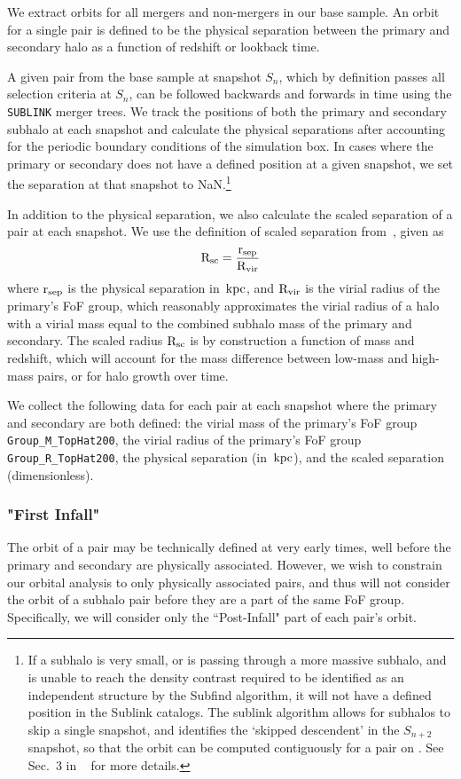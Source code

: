 \documentclass[twocolumn,linenumbers]{aastex631}
\newcommand{\Rvir}{\ensuremath{\rm R_{vir}}}
\newcommand{\Rsc}{\ensuremath{\rm R_{sc}}}
\newcommand{\rsep}{\ensuremath{\rm r_{sep}}}
\begin{document}
We extract orbits for all mergers and non-mergers in our base sample. 
An orbit for a single pair is defined to be the physical separation between the primary and secondary halo as a function of redshift or lookback time. 

A given pair from the base sample at snapshot $S_n$, which by definition passes all selection criteria at $S_n$, can be followed backwards and forwards in time using the \texttt{SUBLINK} merger trees.  
We track the positions of both the primary and secondary subhalo at each snapshot and calculate the physical separations after accounting for the periodic boundary conditions of the simulation box.
In cases where the primary or secondary does not have a defined position at a given snapshot, we set the separation at that snapshot to NaN.\footnote{If a subhalo is very small, or is passing through a more massive subhalo, and is unable to reach the density contrast required to be identified as an independent structure by the Subfind algorithm, it will not have a defined position in the Sublink catalogs. The sublink algorithm allows for subhalos to skip a single snapshot, and identifies the `skipped descendent' in the $S_{n+2}$ snapshot, so that the orbit can be computed contiguously for a pair on . See Sec.~3 in ~\citet{RG2015} for more details.}

In addition to the physical separation, we also calculate the scaled separation of a pair at each snapshot. We use the definition of scaled separation from~\cite{Chamberlain2024}, given as
\begin{equation}
    \rm \Rsc = \frac{\rsep}{\Rvir}
\end{equation}
where $\rsep$ is the physical separation in $\mathrm{\,kpc}$, and $\Rvir$ is the virial radius of the primary's FoF group, which reasonably approximates the virial radius of a halo with a virial mass equal to the combined subhalo mass of the primary and secondary.
The scaled radius $\Rsc$ is by construction a function of mass and redshift, which will account for the mass difference between low-mass and high-mass pairs, or for halo growth over time. 

We collect the following data for each pair at each snapshot where the primary and secondary are both defined: the virial mass of the primary's FoF group \texttt{Group\_M\_TopHat200}, the virial radius of the primary's FoF group \texttt{Group\_R\_TopHat200}, the physical separation (in $\mathrm{\,kpc}$), and the scaled separation (dimensionless).

\subsubsection{"First Infall"}
The orbit of a pair may be technically defined at very early times, well before the primary and secondary are physically associated. 
However, we wish to constrain our orbital analysis to only physically associated pairs, and thus will not consider the orbit of a subhalo pair before they are a part of the same FoF group. Specifically, we will consider only the ``Post-Infall" part of each pair's orbit. 
\end{document}
